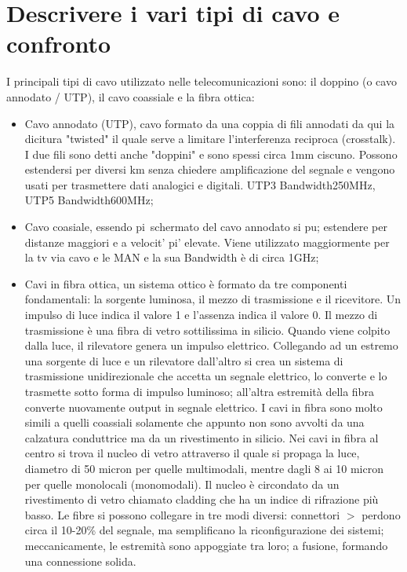 \documentclass{article}
\begin{document}
\section{Descrivere i vari tipi di cavo e confronto}

I principali tipi di cavo utilizzato nelle telecomunicazioni sono: il doppino (o
cavo annodato / UTP), il cavo coassiale e la fibra ottica:
\begin{itemize}
	\item Cavo annodato (UTP), cavo formato da una coppia di fili annodati da
		qui la dicitura "twisted" il quale serve a limitare l'interferenza
		reciproca (crosstalk). I due fili sono detti anche "doppini" e sono
		spessi circa 1mm ciscuno. Possono estendersi per diversi km senza
		chiedere amplificazione del segnale e vengono usati per trasmettere dati
		analogici e digitali. UTP3 Bandwidth250MHz, UTP5 Bandwidth600MHz;

	\item Cavo coasiale, essendo pi\ schermato del cavo annodato si pu;
		estendere per distanze maggiori e a velocit' pi' elevate. Viene
		utilizzato maggiormente per la tv via cavo e le MAN e la sua Bandwidth è
		di circa 1GHz;

	\item Cavi in fibra ottica, un sistema ottico è formato da tre componenti
		fondamentali: la sorgente luminosa, il mezzo di trasmissione e il
		ricevitore. Un impulso di luce indica il valore 1 e l'assenza indica il
		valore 0. Il mezzo di trasmissione è una fibra di vetro sottilissima in
		silicio. Quando viene colpito dalla luce, il rilevatore genera un
		impulso elettrico. Collegando ad un estremo una sorgente di luce e un
		rilevatore dall'altro si crea un sistema di trasmissione unidirezionale
		che accetta un segnale elettrico, lo converte e lo trasmette sotto forma
		di impulso luminoso; all'altra estremità della fibra converte nuovamente
		output in segnale elettrico. I cavi in fibra sono molto simili a quelli
		coassiali solamente che appunto non sono avvolti da una calzatura
		conduttrice ma da un rivestimento in silicio. Nei cavi in fibra al
		centro si trova il nucleo di vetro attraverso il quale si propaga la
		luce, diametro di 50 micron per quelle multimodali, mentre dagli 8 ai 10
		micron per quelle monolocali (monomodali). Il nucleo è circondato da un
		rivestimento di vetro chiamato cladding che ha un indice di rifrazione
		più basso. Le fibre si possono collegare in tre modi diversi: connettori
		$>$ perdono circa il 10-20\% del segnale, ma semplificano la
		riconfigurazione dei sistemi; meccanicamente, le estremità sono
		appoggiate tra loro; a fusione, formando una connessione solida.

\end{itemize}
\end{document}
